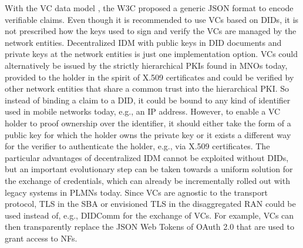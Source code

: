\documentclass[conference]{IEEEtran}
\begin{document}
With the VC data model \cite{WorldWideWebConsortium.05.11.2021}, the W3C proposed a generic JSON format to encode verifiable claims. Even though it is recommended to use VCs based on DIDs, it is not prescribed how the keys used to sign and verify the VCs are managed by the network entities. Decentralized IDM with public keys in DID documents and private keys at the network entities is just one implementation option. VCs could alternatively be issued by the strictly hierarchical PKIs found in MNOs today, provided to the holder in the spirit of X.509 certificates and could be verified by other network entities that share a common trust into the hierarchical PKI. So instead of binding a claim to a DID, it could be bound to any kind of identifier used in mobile networks today, e.g., an IP address. However, to enable a VC holder to proof ownership over the identifier, it should either take the form of a public key for which the holder owns the private key or it exists a different way for the verifier to authenticate the holder, e.g., via X.509 certificates. The particular advantages of decentralized IDM cannot be exploited without DIDs, but an important evolutionary step can be taken towards a uniform solution for the exchange of credentials, which can already be incrementally rolled out with legacy systems in PLMNs today. Since VCs are agnostic to the transport protocol, TLS in the SBA or envisioned TLS in the disaggregated RAN could be used instead of, e.g., DIDComm for the exchange of VCs. For example, VCs can then transparently replace the JSON Web Tokens of OAuth 2.0 that are used to grant access to NFs. 



 


\end{document}
